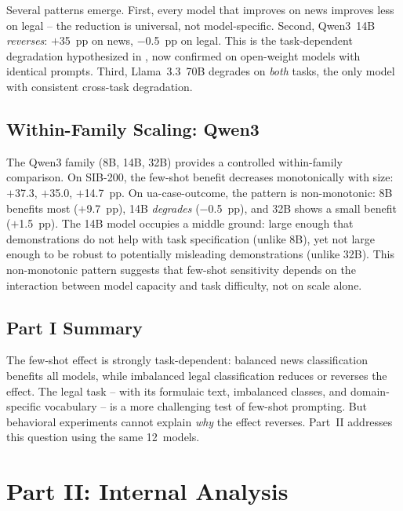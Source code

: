 \documentclass[11pt,a4paper]{article}
\begin{document}


Several patterns emerge. First, every model that improves on news improves less on legal -- the reduction is universal, not model-specific. Second, Qwen3~14B \emph{reverses}: $+$35~pp on news, $-$0.5~pp on legal. This is the task-dependent degradation hypothesized in \citet{ovcharov2026tokenizer}, now confirmed on open-weight models with identical prompts. Third, Llama~3.3~70B degrades on \emph{both} tasks, the only model with consistent cross-task degradation.

\subsection{Within-Family Scaling: Qwen3}

The Qwen3 family (8B, 14B, 32B) provides a controlled within-family comparison. On SIB-200, the few-shot benefit decreases monotonically with size: $+$37.3, $+$35.0, $+$14.7~pp. On ua-case-outcome, the pattern is non-monotonic: 8B benefits most ($+$9.7~pp), 14B \emph{degrades} ($-$0.5~pp), and 32B shows a small benefit ($+$1.5~pp). The 14B model occupies a middle ground: large enough that demonstrations do not help with task specification (unlike 8B), yet not large enough to be robust to potentially misleading demonstrations (unlike 32B). This non-monotonic pattern suggests that few-shot sensitivity depends on the interaction between model capacity and task difficulty, not on scale alone.

\subsection{Part I Summary}

The few-shot effect is strongly task-dependent: balanced news classification benefits all models, while imbalanced legal classification reduces or reverses the effect. The legal task -- with its formulaic text, imbalanced classes, and domain-specific vocabulary -- is a more challenging test of few-shot prompting. But behavioral experiments cannot explain \emph{why} the effect reverses. Part~II addresses this question using the same 12~models.

\section{Part II: Internal Analysis}
\label{sec:internal_methods}
\end{document}
